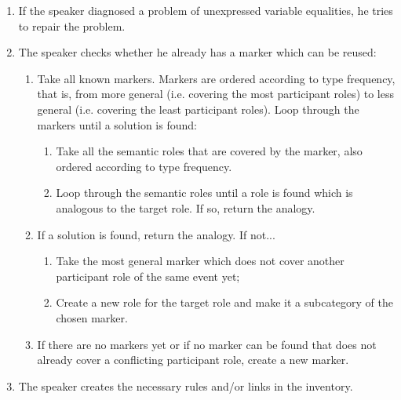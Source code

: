 \begin{enumerate}
\item If the speaker diagnosed a problem of unexpressed variable equalities, he tries to repair the problem.
\item The speaker checks whether he already has a marker which can be reused:
\begin{enumerate}
\item Take all known markers. Markers are ordered according to type frequency, that is, from more general (i.e. covering the most participant roles) to less general (i.e. covering the least participant roles). Loop through the markers until a solution is found:
\begin{enumerate}
\item Take all the semantic roles that are covered by the marker, also ordered according to type frequency.
\item Loop through the semantic roles until a role is found which is analogous to the target role. If so, return the analogy.
\end{enumerate}
\item If a solution is found, return the analogy. If not...
\begin{enumerate}
\item Take the most general marker which does not cover another participant role of the same event yet;
\item Create a new role for the target role and make it a subcategory of the chosen marker.
\end{enumerate}
\item If there are no markers yet or if no marker can be found that does not already cover a conflicting participant role, create a new marker.
\end{enumerate}
\item The speaker creates the necessary rules and/or links in the inventory.
\end{enumerate}

